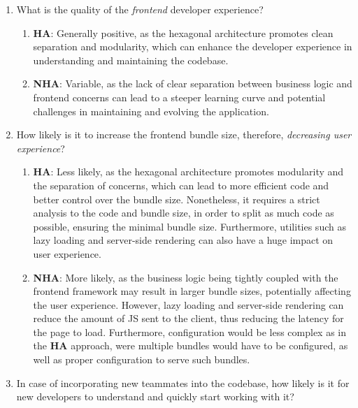 \documentclass[../design.tex]{subfiles}
\begin{document}
\begin{enumerate}
	\item What is the quality of the \emph{frontend} developer experience?
	      \begin{enumerate}[label=-]
		      \item \textbf{HA}: Generally positive, as the hexagonal architecture
		            promotes clean separation and modularity, which can enhance the
		            developer experience in understanding and maintaining the codebase.
		      \item \textbf{NHA}: Variable, as the lack of clear separation between
		            business logic and frontend concerns can lead to a steeper learning
		            curve and potential challenges in maintaining and evolving the
		            application.
	      \end{enumerate}
	\item How likely is it to increase the frontend bundle size, therefore,
	      \emph{decreasing user experience}?
	      \begin{enumerate}[label=-]
		      \item \textbf{HA}: Less likely, as the hexagonal architecture promotes
		            modularity and the separation of concerns, which can lead to more
		            efficient code and better control over the bundle size.
		            Nonetheless, it requires a strict analysis to the code and
		            bundle size, in order to split as much code as possible,
		            ensuring the minimal bundle size. Furthermore, utilities
		            such as lazy loading and server-side rendering can also have
		            a huge impact on user experience.
		      \item \textbf{NHA}: More likely, as the business logic being tightly
		            coupled with the frontend framework may result in larger bundle
		            sizes, potentially affecting the user experience. However,
		            lazy loading and server-side rendering can reduce the amount
		            of JS sent to the client, thus reducing the latency for the
		            page to load. Furthermore, configuration would be less
		            complex as in the \textbf{HA} approach, were multiple
		            bundles would have to be configured, as well as proper
		            configuration to serve such bundles.
	      \end{enumerate}
	\item In case of incorporating new teammates into the codebase, how likely
	      is it for new developers to understand and quickly start working with it?

\end{enumerate}
\end{document}
